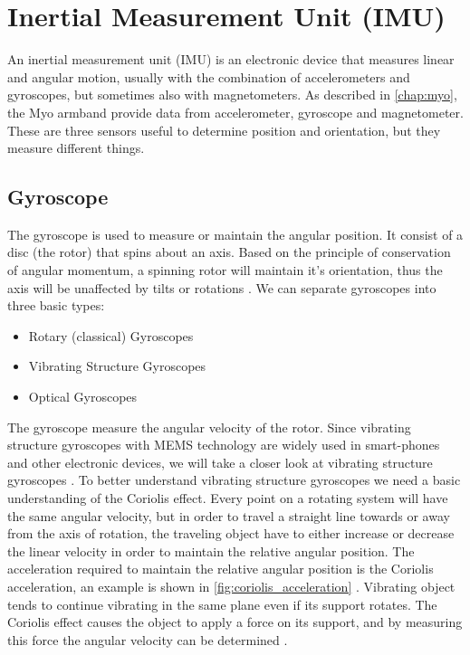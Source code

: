 \section{Inertial Measurement Unit (IMU)}
An inertial measurement unit (IMU) is an electronic device that measures linear and angular motion, usually with the combination of accelerometers and gyroscopes, but sometimes also with magnetometers. As described in \cref{chap:myo}, the Myo armband provide data from accelerometer, gyroscope and magnetometer. These are three sensors useful to determine position and orientation, but they measure different things.

\subsection{Gyroscope}
The gyroscope is used to measure or maintain the angular position. It consist of a disc (the rotor) that spins about an axis. Based on the principle of conservation of angular momentum, a spinning rotor will maintain it's orientation, thus the axis will be unaffected by tilts or rotations \cite{gyroscope_demonstration_project}. We can separate gyroscopes into three basic types:

\begin{itemize}
    \item Rotary (classical) Gyroscopes
    \item Vibrating Structure Gyroscopes
    \item Optical Gyroscopes
\end{itemize}

The gyroscope measure the angular velocity of the rotor. Since vibrating structure gyroscopes with MEMS technology are widely used in smart-phones and other electronic devices, we will take a closer look at vibrating structure gyroscopes \cite{wiki:Vibrating_structure_gyroscope}. To better understand vibrating structure gyroscopes we need a basic understanding of the Coriolis effect. Every point on a rotating system will have the same angular velocity, but in order to travel a straight line towards or away from the axis of rotation, the traveling object have to either increase or decrease the linear velocity in order to maintain the relative angular position. The acceleration required to maintain the relative angular position is the Coriolis acceleration, an example is shown in \cref{fig:coriolis_acceleration} \cite{vibrating_structure_gyroscope}. Vibrating object tends to continue vibrating in the same plane even if its support rotates. The Coriolis effect causes the object to apply a force on its support, and by measuring this force the angular velocity can be determined \cite{wiki:Vibrating_structure_gyroscope}.

